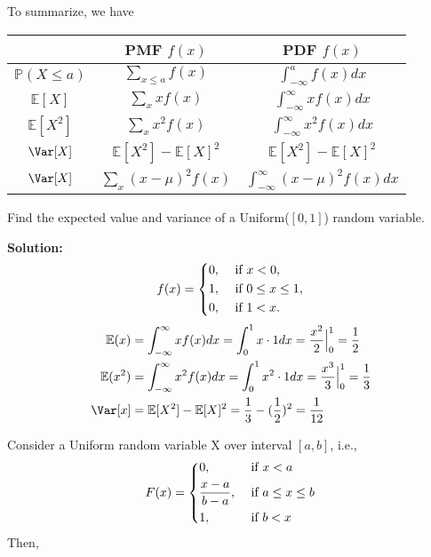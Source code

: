 To summarize, we have 
\begin{table}[H]
    \centering
    \begin{tabular}{c c c}
        \toprule
             & PMF \(f(x)\)  & PDF \(f(x)\)  \\
        \midrule
            \(\mathbb{P}(X \leq a)\)  & \(\sum_{x \leq a} f(x)\)  & \(\int_{-\infty}^a f(x)dx \)   \\[5pt]
            \(\mathbb{E}[X]\) & \(\sum_{x} xf(x)\) & \(\int_{-\infty}^{\infty} xf(x)dx \)  \\[5pt]
            \(\mathbb{E}[X^2]\) & \(\sum_{x} x^2f(x)\) & \(\int_{-\infty}^{\infty} x^2f(x)dx \)  \\[5pt]
            \(\Var[X]\) & \(\mathbb{E}[X^2] - \mathbb{E}[X]^2\)  & \(\mathbb{E}[X^2] - \mathbb{E}[X]^2\)  \\[5pt]
            \(\Var[X]\) & \(\sum_{x} (x - \mu)^2 f(x)\)  & \(\int_{-\infty}^{\infty} (x - \mu)^2 f(x)dx \)  \\[5pt]
        \bottomrule
    \end{tabular}
\end{table} 

\begin{eg}
    Find the expected value and variance of a Uniform(\([0, 1]\)) random variable.

    \textbf{Solution:} 
    \[
        f(x) = \begin{dcases}
            0, &\text{ if } x < 0 ,\\
            1, &\text{ if } 0 \leq x \leq 1 ,\\
            0, &\text{ if } 1 < x.
        \end{dcases}
    \]
    \[
    \begin{aligned}
        \mathbb{E}(x) &= \int_{-\infty} ^{\infty} xf(x)dx = \int_{0}^{1} x \cdot 1 dx = \dfrac{x^2}{2} \Big|_0^1 = \frac{1}{2} \\
        \mathbb{E}(x^2) &= \int_{-\infty} ^{\infty} x^2f(x)dx = \int_{0}^{1} x^2 \cdot 1 dx = \dfrac{x^3}{3} \Big|_0^1 = \frac{1}{3} \\
        \Var[x] &= \mathbb{E}[X^2] - \mathbb{E}[X]^2 = \dfrac{1}{3} - (\dfrac{1}{2})^2 = \dfrac{1}{12}
    \end{aligned}
    \]
\end{eg}

Consider a Uniform random variable X over interval \([a, b]\), i.e., 
\[
    F(x) = \begin{dcases}
        0, &\text{ if } x < a \\
        \frac{x - a}{b - a}, &\text{ if } a \leq x \leq b \\
        1 , &\text{ if } b < x
    \end{dcases}
\]
Then,

